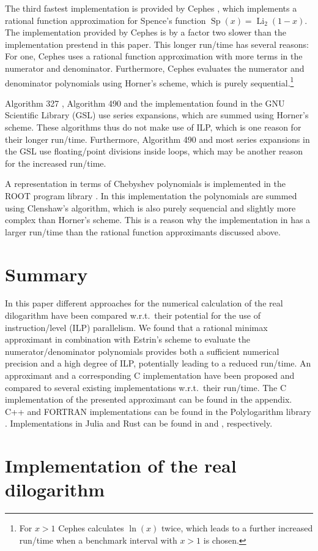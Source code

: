 \documentclass[10pt,DIV16,twocolumn,numbers=noenddot]{scrartcl}
\newcommand{\Li}{\operatorname{Li}_2}
\begin{document}
The third fastest implementation is provided by Cephes \cite{cephes},
which implements a rational function approximation for Spence's
function $\operatorname{Sp}(x)=\Li(1-x)$.  The implementation provided
by Cephes is by a factor two slower than the implementation prestend
in this paper.  This longer run\-/time has several reasons: For one,
Cephes uses a rational function approximation with more terms in the
numerator and denominator.  Furthermore, Cephes evaluates the
numerator and denominator polynomials using Horner's scheme, which is
purely sequential.\footnote{For $x>1$ Cephes calculates $\ln(x)$
  twice, which leads to a further increased run\-/time when a benchmark
  interval with $x>1$ is chosen.}

Algorithm 327 \cite{koelbigDilog}, Algorithm 490 \cite{ginsberg} and
the implementation found in the GNU Scientific Library (GSL)
\cite{gsl} use series expansions, which are summed using Horner's
scheme.  These algorithms thus do not make use of ILP, which is one
reason for their longer run\-/time.  Furthermore, Algorithm 490 and most
series expansions in the GSL use floating\-/point divisions inside
loops, which may be another reason for the increased run\-/time.

A representation in terms of Chebyshev polynomials \cite{luke} is
implemented in the ROOT program library \cite{root}.  In this
implementation the polynomials are summed using Clenshaw's algorithm,
which is also purely sequencial and slightly more complex than
Horner's scheme.  This is a reason why the implementation in
\cite{root} has a larger run\-/time than the rational function
approximants discussed above.

\section{Summary}

In this paper different approaches for the numerical calculation of
the real dilogarithm have been compared w.r.t.\ their potential for
the use of instruction\-/level (ILP) parallelism.  We found that a
rational minimax approximant in combination with Estrin's scheme to
evaluate the numerator/denominator polynomials provides both a
sufficient numerical precision and a high degree of ILP, potentially
leading to a reduced run\-/time.  An approximant and a corresponding C
implementation have been proposed and compared to several existing
implementations w.r.t.\ their run\-/time.  The C implementation of the
presented approximant can be found in the appendix.  C++ and FORTRAN
implementations can be found in the Polylogarithm library
\cite{polylogarithm}.  Implementations in Julia and Rust can be found
in \cite{PolyLog.jl} and \cite{polylog}, respectively.

\appendix

\section{Implementation of the real dilogarithm}





\end{document}
